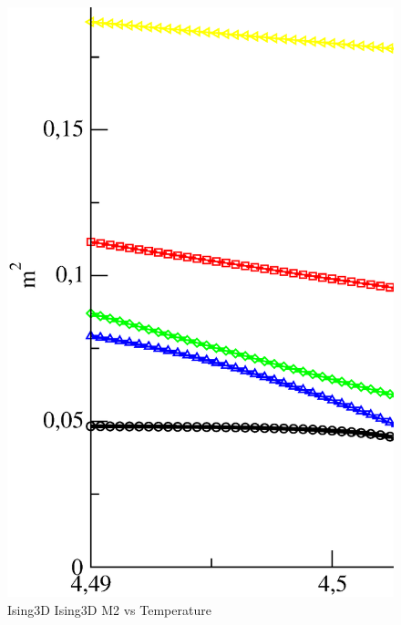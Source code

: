 \begin{figure}[!htpb]
  \centering
  \includegraphics[width=\textwidth]{./plots/Ising3D/Ising3D_M2_vs_Temperature.eps}
  \caption{Ising3D Ising3D M2 vs Temperature}
\end{figure}

